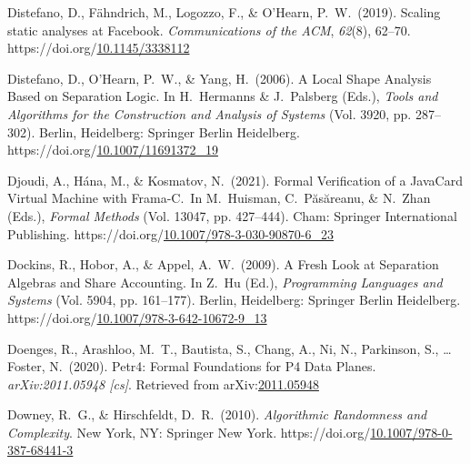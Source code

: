 \documentclass[12pt,twoside]{article}
\begin{document}
{\begin{thebibliography}{1079}
\mdbibitemlabel{}Distefano, D., Fähndrich, M., Logozzo, F., \& O’Hearn, P.~W.~(2019). Scaling static analyses at Facebook. \emph{Communications of the ACM}, \emph{62}(8), 62–70. https://doi.org/\href{https://dx.doi.org/10.1145/3338112}{10.1145/3338112}%

\mdbibitemlabel{}Distefano, D., O’Hearn, P.~W., \& Yang, H.~(2006). A Local Shape Analysis Based on Separation Logic. In H.~Hermanns \& J.~Palsberg (Eds.), \emph{Tools and Algorithms for the Construction and Analysis of Systems} (Vol. 3920, pp. 287–302). Berlin, Heidelberg: Springer Berlin Heidelberg. https://doi.org/\href{https://dx.doi.org/10.1007/11691372_19}{10.1007/11691372\_19}%

\mdbibitemlabel{}Djoudi, A., Hána, M., \& Kosmatov, N.~(2021). Formal Verification of a JavaCard Virtual Machine with Frama-C.~In M.~Huisman, C.~Păsăreanu, \& N.~Zhan (Eds.), \emph{Formal Methods} (Vol. 13047, pp. 427–444). Cham: Springer International Publishing. https://doi.org/\href{https://dx.doi.org/10.1007/978-3-030-90870-6_23}{10.1007/978-3-030-90870-6\_23}%

\mdbibitemlabel{}Dockins, R., Hobor, A., \& Appel, A.~W.~(2009). A Fresh Look at Separation Algebras and Share Accounting. In Z.~Hu (Ed.), \emph{Programming Languages and Systems} (Vol. 5904, pp. 161–177). Berlin, Heidelberg: Springer Berlin Heidelberg. https://doi.org/\href{https://dx.doi.org/10.1007/978-3-642-10672-9_13}{10.1007/978-3-642-10672-9\_13}%

\mdbibitemlabel{}Doenges, R., Arashloo, M.~T., Bautista, S., Chang, A., Ni, N., Parkinson, S., … Foster, N.~(2020). Petr4: Formal Foundations for P4 Data Planes. \emph{arXiv:2011.05948 {}[cs]}. Retrieved from arXiv:\href{http://arxiv.org/abs/2011.05948}{2011.05948}%

\mdbibitemlabel{}Downey, R.~G., \& Hirschfeldt, D.~R.~(2010). \emph{Algorithmic Randomness and Complexity}. New York, NY: Springer New York. https://doi.org/\href{https://dx.doi.org/10.1007/978-0-387-68441-3}{10.1007/978-0-387-68441-3}%


\end{thebibliography}}
\end{document}
